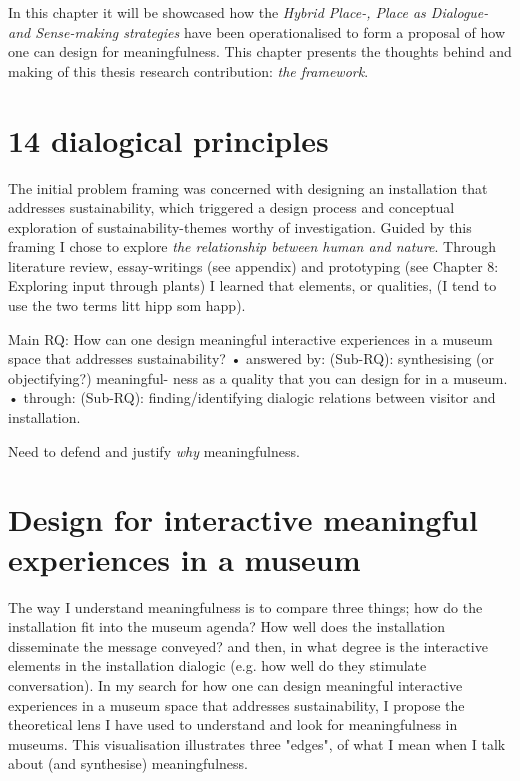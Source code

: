 In this chapter it will be showcased how the \emph{Hybrid Place-, Place as Dialogue- and Sense-making strategies} have been operationalised to form a proposal of how one can design for meaningfulness. This chapter presents the thoughts behind and making of this thesis research contribution: \emph{the framework}.

\section{14 dialogical principles}


The initial problem framing was concerned with designing an installation that addresses sustainability, which triggered a design process and conceptual exploration of sustainability-themes worthy of investigation. Guided by this framing I chose to explore \emph{the relationship between human and nature}. Through literature review, essay-writings (see appendix) and prototyping (see Chapter 8: Exploring input through plants) I learned that elements, or qualities, (I tend to use the two terms litt hipp som happ). 




Main RQ: How can one design meaningful interactive experiences in
a museum space that addresses sustainability?
• answered by: (Sub-RQ): synthesising (or objectifying?) meaningful-
ness as a quality that you can design for in a museum.
• through: (Sub-RQ): finding/identifying dialogic relations between
visitor and installation.

Need to defend and justify \emph{why} meaningfulness. 

\section{Design for interactive meaningful experiences in a museum}

The way I understand meaningfulness is to compare three things; how do the installation fit into the museum agenda? How well does the installation disseminate the message conveyed? and then, in what degree is the interactive elements in the installation dialogic (e.g. how well do they stimulate conversation). In my search for how one can design meaningful interactive experiences in a museum space that addresses sustainability, I propose the theoretical lens I have used to understand and look for meaningfulness in museums. This visualisation illustrates three "edges", of what I mean when I talk about (and synthesise) meaningfulness. 


